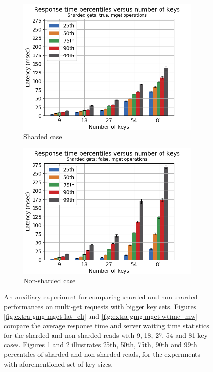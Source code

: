 \documentclass[11pt,a4paper]{article}
\begin{document}
\begin{figure}[h]
\begin{subfigure}{.5\textwidth}
  \centering
  \includegraphics[width=1.0\linewidth ,trim={5px 0px 20px 0px},clip]{img/plot/extra-gmg-perc-true.png}
  \caption{Sharded case}
  \label{fig:extra-gmg-perc-true}
\end{subfigure}%
\begin{subfigure}{.5\textwidth}
  \centering
  \includegraphics[width=1.0\linewidth ,trim={5px 0px 20px 0px},clip]{img/plot/extra-gmg-perc-false.png}
  \caption{Non-sharded case}
  \label{fig:extra-gmg-perc-false}
\end{subfigure}
\caption{An auxiliary experiment for comparing sharded and non-sharded performances on multi-get requests with bigger key sets. Figures \ref{fig:extra-gmg-mget-lat_cli} and \ref{fig:extra-gmg-mget-wtime_mw} compare the average response time and server waiting time statistics for the sharded and non-sharded reads with 9, 18, 27, 54 and 81 key cases. Figures \ref{fig:extra-gmg-perc-true} and \ref{fig:extra-gmg-perc-false} illustrates 25th, 50th, 75th, 90th and 99th percentiles of sharded and non-sharded reads, for the experiments with aforementioned set of key sizes.}
\label{fig:extra-gmg}
\end{figure}
\end{document}
